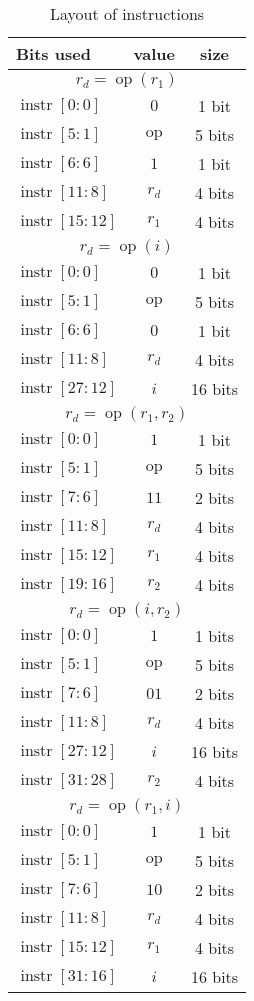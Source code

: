 \documentclass{scrartcl}
\DeclareMathOperator{\op}{op}
\DeclareMathOperator{\instr}{instr}
\begin{document}
\begin{table}
  \center
  \label{tab:instrs}
  \caption{Layout of instructions}
  \begin{tabular}{lcc}
    \toprule
    \textbf{Bits used} & \textbf{value} & \textbf{size}\\
    \midrule
    \multicolumn{3}{c}{\(r_d = \op(r_1)\)}\\
    \(\instr[0:0]\) & \(0\) & 1 bit\\
    \(\instr[5:1]\) & \(\op\) & 5 bits\\
    \(\instr[6:6]\) & \(1\) & 1 bit\\
    \(\instr[11:8]\) & \(r_d\) & 4 bits\\
    \(\instr[15:12]\) & \(r_1\) & 4 bits\\
    \midrule
    \multicolumn{3}{c}{\(r_d = \op(i)\)}\\
    \(\instr[0:0]\) & \(0\) & 1 bit\\
    \(\instr[5:1]\) & \(\op\) & 5 bits\\
    \(\instr[6:6]\) & \(0\) & 1 bit\\
    \(\instr[11:8]\) & \(r_d\) & 4 bits\\
    \(\instr[27:12]\) & \(i\) & 16 bits\\
    \midrule
    \multicolumn{3}{c}{\(r_d = \op(r_1, r_2)\)}\\
    \(\instr[0:0]\) & \(1\) & 1 bit\\
    \(\instr[5:1]\) & \(\op\) & 5 bits\\
    \(\instr[7:6]\) & \(11\) & 2 bits\\
    \(\instr[11:8]\) & \(r_d\) & 4 bits\\
    \(\instr[15:12]\) & \(r_1\) & 4 bits\\
    \(\instr[19:16]\) & \(r_2\) & 4 bits\\
    \midrule
    \multicolumn{3}{c}{\(r_d = \op(i, r_2)\)}\\
    \(\instr[0:0]\) & \(1\) & 1 bits\\
    \(\instr[5:1]\) & \(\op\) & 5 bits\\
    \(\instr[7:6]\) & \(01\) & 2 bits\\
    \(\instr[11:8]\) & \(r_d\) & 4 bits\\
    \(\instr[27:12]\) & \(i\) & 16 bits\\
    \(\instr[31:28]\) & \(r_2\) & 4 bits\\
    \midrule
    \multicolumn{3}{c}{\(r_d = \op(r_1, i)\)}\\
    \(\instr[0:0]\) & \(1\) & 1 bit\\
    \(\instr[5:1]\) & \(\op\) & 5 bits\\
    \(\instr[7:6]\) & \(10\) & 2 bits\\
    \(\instr[11:8]\) & \(r_d\) & 4 bits\\
    \(\instr[15:12]\) & \(r_1\) & 4 bits\\
    \(\instr[31:16]\) & \(i\) & 16 bits\\
    \bottomrule
  \end{tabular}
\end{table}
\end{document}
